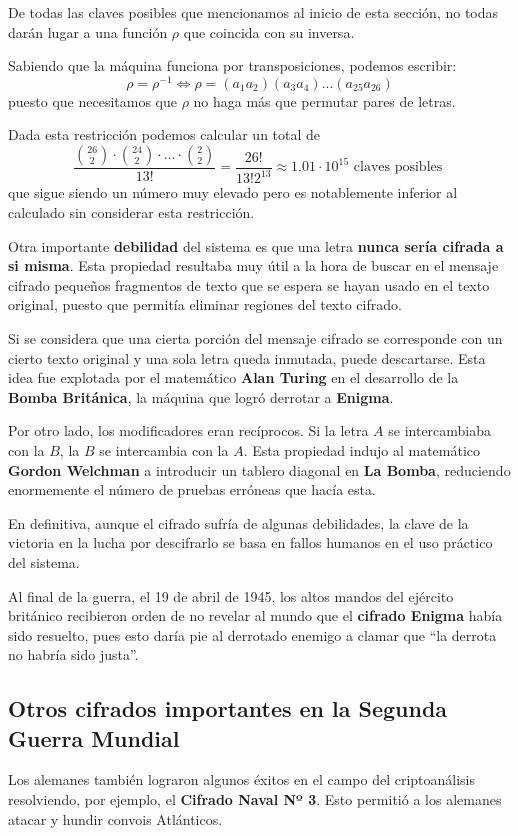 \documentclass[nochap]{apuntesURJC}
\begin{document}
De todas las claves posibles que mencionamos al inicio de esta sección, no todas darán lugar a una función $\rho$ que coincida con su inversa.

Sabiendo que la máquina funciona por transposiciones, podemos escribir:
\[\rho = \rho^{-1} \iff \rho = (a_1a_2)(a_3a_4)...(a_{25}a_{26})\]
puesto que necesitamos que $\rho$ no haga más que permutar pares de letras.

Dada esta restricción podemos calcular un total de
\[\frac{{26 \choose 2} \cdot {24 \choose 2} \cdot ... \cdot {2 \choose 2}}{13!} =\frac{26!}{13!2^{13}} \approx 1.01 \cdot 10^{15} \text{ claves posibles }\]
que sigue siendo un número muy elevado pero es notablemente inferior al calculado sin considerar esta restricción.

Otra importante \textbf{debilidad} del sistema es que una letra \textbf{nunca sería cifrada a si misma}. Esta propiedad resultaba muy útil a la hora de buscar en el mensaje cifrado pequeños fragmentos de texto que se espera se hayan usado en el texto original, puesto que permitía eliminar regiones del texto cifrado.

Si se considera que una cierta porción del mensaje cifrado se corresponde con un cierto texto original y una sola letra queda inmutada, puede descartarse. Esta idea fue explotada por el matemático \textbf{Alan Turing} en el desarrollo de la \textbf{Bomba Británica}, la máquina que logró derrotar a \textbf{Enigma}.

Por otro lado, los modificadores eran recíprocos. Si la letra $A$ se intercambiaba con la $B$, la $B$ se intercambia con la $A$. Esta propiedad indujo al matemático \textbf{Gordon Welchman} a introducir un tablero diagonal en \textbf{La Bomba}, reduciendo enormemente el número de pruebas erróneas que hacía esta.

En definitiva, aunque el cifrado sufría de algunas debilidades, la clave de la victoria en la lucha por descifrarlo se basa en fallos humanos en el uso práctico del sistema.

Al final de la guerra, el 19 de abril de 1945, los altos mandos del ejército británico recibieron orden de no revelar al mundo que el \textbf{cifrado Enigma} había sido resuelto, pues esto daría pie al derrotado enemigo a clamar que ``la derrota no habría sido justa''.

\subsection{Otros cifrados importantes en la Segunda Guerra Mundial}
Los alemanes también lograron algunos éxitos en el campo del criptoanálisis resolviendo, por ejemplo, el \textbf{Cifrado Naval Nº 3}. Esto permitió a los alemanes atacar y hundir convois Atlánticos.
\end{document}
